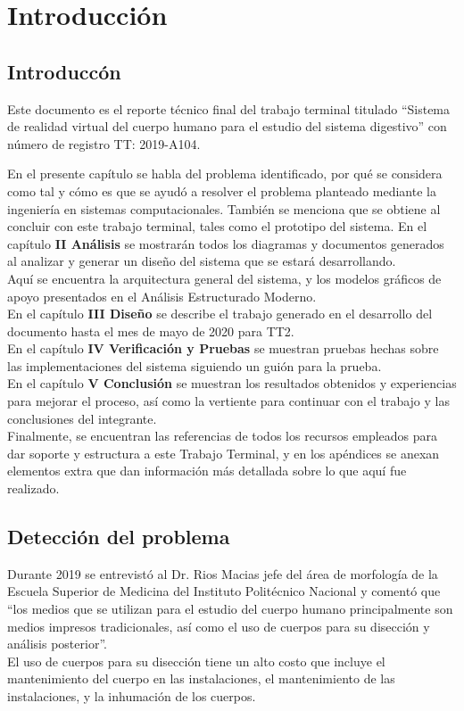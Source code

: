 \chapter{Introducción}

\section{Introduccón}

Este documento es el reporte técnico final del trabajo terminal titulado 
“Sistema de realidad virtual del cuerpo humano para el estudio del sistema digestivo”
 con número de registro TT: 2019-A104.

En el presente capítulo se habla del problema identificado, 
por qué se considera como tal y cómo es que se ayudó a resolver el problema planteado mediante la 
ingeniería en sistemas computacionales. También se menciona que se obtiene al concluir con este trabajo terminal, tales como el prototipo del sistema.
En el capítulo \textbf{II Análisis} se mostrarán todos los diagramas y documentos generados al analizar y generar un diseño del sistema que se estará desarrollando.\\
 Aquí se encuentra la arquitectura general del sistema, y los modelos gráficos de apoyo presentados en el Análisis Estructurado Moderno.\\
En el capítulo \textbf{III Diseño} se describe el trabajo generado en el desarrollo del documento hasta el mes de mayo de 2020 para TT2.\\
En el capítulo \textbf{IV Verificación y Pruebas} se muestran pruebas hechas sobre las implementaciones del sistema siguiendo un guión para la prueba.\\
En el capítulo \textbf{V Conclusión} se muestran los resultados obtenidos y experiencias para mejorar el proceso, así como la vertiente para continuar con el trabajo
 y las conclusiones del integrante.\\
Finalmente, se encuentran las referencias de todos los recursos empleados para dar soporte y estructura a este Trabajo Terminal, y en los apéndices se anexan elementos
 extra que dan información más detallada sobre lo que aquí fue realizado.\\

\section{Detección del problema} 
Durante 2019 se entrevistó al Dr. Rios Macias jefe del área de morfología de la Escuela Superior de Medicina del Instituto Politécnico Nacional y comentó que “los medios
 que se utilizan para el estudio del cuerpo humano principalmente son medios impresos tradicionales, así como el uso de cuerpos para su disección y análisis posterior”.\\
 El uso de cuerpos para su disección tiene un alto costo que incluye el mantenimiento del cuerpo en las instalaciones, el mantenimiento de las instalaciones, y la inhumación 
 de los cuerpos.
\\
\newline

